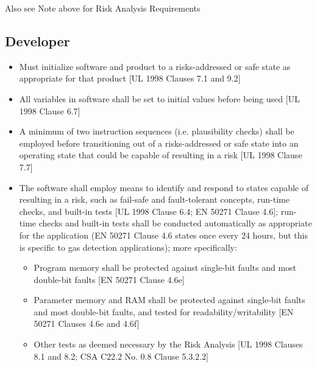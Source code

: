 \documentclass[12pt]{../Common_files/ElisaPaper}
\begin{document}
Also see Note above for Risk Analysis Requirements

\subsection{Developer}

\begin{itemize}

\item Must initialize software and product to a risks-addressed or safe state as appropriate for that product [UL 1998 \cite{UL1998} Clauses 7.1 and 9.2]

\item All variables in software shall be set to initial values before being used [UL 1998 \cite{UL1998} Clause 6.7]

\item A minimum of two instruction sequences (i.e. plausibility checks) shall be employed before transitioning out of a risks-addressed or safe state into an operating state that could be capable of resulting in a risk [UL 1998 \cite{UL1998} Clause 7.7]

\item The software shall employ means to identify and respond to states capable of resulting in a risk, such as fail-safe and fault-tolerant concepts, run-time checks, and built-in tests [UL 1998 \cite{UL1998} Clause 6.4; EN 50271 \cite{EN50271} Clause 4.6]; run-time checks and built-in tests shall be conducted automatically as appropriate for the application (EN 50271 \cite{EN50271} Clause 4.6 states once every 24 hours, but this is specific to gas detection applications); more specifically:

\begin{itemize}

\item Program memory shall be protected against single-bit faults and most double-bit faults [EN 50271 \cite{EN50271} Clause 4.6e]

\item Parameter memory and RAM shall be protected against single-bit faults and most  double-bit faults, and tested for readability/writability [EN 50271 \cite{EN50271} Clauses 4.6e and 4.6f]

\item Other tests as deemed necessary by the Risk Analysis [UL 1998 \cite{UL1998} Clauses 8.1 and 8.2; CSA C22.2 No. 0.8 \cite{CSA0.8} Clause 5.3.2.2]

\end{itemize}


\end{itemize}
\end{document}
